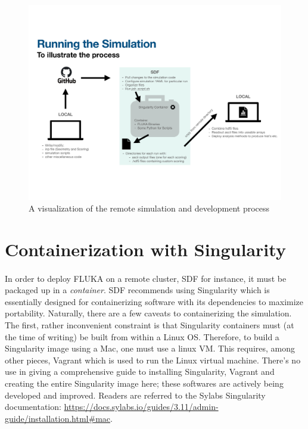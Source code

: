 \begin{figure}[h]
    \begin{center}
    \includegraphics[scale=0.5]{figures/sim_diagram.pdf}
    \caption{A visualization of the remote simulation and development process}
    \label{fig:process1}
    \end{center}
\end{figure}

\section*{Containerization with Singularity}

\paragraph{}
In order to deploy FLUKA on a remote cluster, SDF for instance, it must be packaged up in a \textit{container}. SDF recommends using Singularity which is essentially designed for containerizing software with its dependencies to maximize portability. Naturally, there are a few caveats to containerizing the simulation. The first, rather inconvenient constraint is that Singularity containers must (at the time of writing) be built from within a Linux OS. Therefore, to build a Singularity image using a Mac, one must use a linux VM. This requires, among other pieces, Vagrant which is used to run the Linux virtual machine. There's no use in giving a comprehensive guide to installing Singularity, Vagrant and creating the entire Singularity image here; these softwares are actively being developed and improved. Readers are referred to the Sylabs Singularity documentation: \url{https://docs.sylabs.io/guides/3.11/admin-guide/installation.html#mac}.

